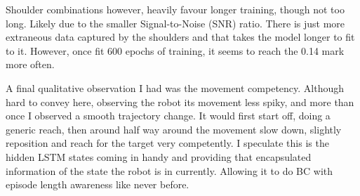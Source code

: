Shoulder combinations however, heavily favour longer training, though not too long. Likely due to the smaller Signal-to-Noise (SNR) ratio. There is just more extraneous data captured by the shoulders and that takes the model longer to fit to it. However, once fit 600 epochs of training, it seems to reach the 0.14 mark more often. 

A final qualitative observation I had was the movement competency. Although hard to convey here, observing the robot its movement less spiky, and more than once I observed a smooth trajectory change. It would first start off, doing a generic reach, then around half way around the movement slow down, slightly reposition and reach for the target very competently. I speculate this is the hidden LSTM states coming in handy and providing that encapsulated information of the state the robot is in currently. Allowing it to do BC with episode length awareness like never before.

